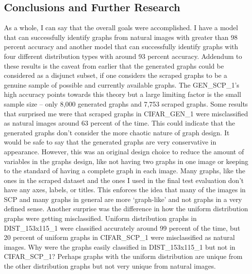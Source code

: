 \documentclass[12pt]{article}
\begin{document}
        
        \newpage \subsection{Conclusions and Further Research}

       
            As a whole, I can say that the overall goals were accomplished. 
            I have a model that can successfully identify graphs from natural images 
            with greater than 98 percent accuracy and another model that can successfully identify graphs 
            with four different distribution types with around 93 percent accuracy. 
            Addendum to these results is the caveat from earlier that the generated graphs could be considered as a disjunct subset, 
            if one considers the scraped graphs to be a genuine sample of possible and currently available graphs. 
            The GEN\_SCP\_1’s high accuracy points towards this theory but a large limiting factor is the small sample size -- 
            only 8,000 generated graphs and 7,753 scraped graphs. 
            Some results that surprised me were that scraped graphs in CIFAR\_GEN\_1 were misclassified as natural images 
            around 63 percent of the time. This could indicate 
            that the generated graphs don’t consider the more chaotic nature of graph design. 
            It would be safe to say that the generated graphs are very conservative in appearance. 
            However, this was an original design choice to reduce the amount of variables in the graphs design, 
            like not having two graphs in one image or keeping to the standard of having a complete graph in each image. 
            Many graphs, like the ones in the scraped dataset 
            and the ones I used in the final test evaluation don’t have any axes, labels, or titles. 
            This enforces the idea that many of the images in SCP and many graphs in general are more ‘graph-like’ 
            and not graphs in a very defined sense.
            Another surprise was the difference in how the uniform distribution graphs were getting misclassified.
            Uniform distribution graphs in DIST\_153x115\_1 were classified accurately around 99 percent of the time, 
            but 20 percent of uniform graphs in CIFAR\_SCP\_1 were misclassified as natural images. 
            Why were the graphs easily classified in DIST\_153x115\_1 but not in CIFAR\_SCP\_1? 
            Perhaps graphs with the uniform distribution are unique from the other distribution graphs but not very unique from natural images.
            
\end{document}
